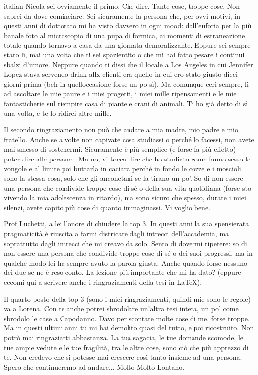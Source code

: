 \begin{otherlanguage*}{italian}
Nicola sei ovviamente il primo. Che dire. Tante cose, troppe cose. Non saprei da dove cominciare. Sei sicuramente la persona che, per ovvi motivi, in questi anni di dottorato mi ha visto davvero in ogni mood: dall'euforia per la più banale foto al microscopio di una pupa di formica, ai momenti di estraneazione totale quando tornavo a casa da una giornata demoralizzante. Eppure sei sempre stato lì, mai una volta che ti sei spazientito o che mi hai fatto pesare i continui sbalzi d'umore. Neppure quando ti dissi che il locale a Los Angeles in cui Jennifer Lopez stava servendo drink allx clienti era quello in cui ero stato giusto dieci giorni prima (beh in quell\curlyapostrophe{}occasione forse un po\curlyapostrophe{} sì). Ma comunque c\curlyapostrophe{}eri sempre, lì ad ascoltare le mie paure e i miei progetti, i miei mille ripensamenti e le mie fantasticherie sul riempire casa di piante e crani di animali. Ti ho già detto di sì una volta, e te lo ridirei altre mille.

Il secondo ringraziamento non può che andare a mia madre, mio padre e mio fratello. Anche se a volte non capivate cosa studiassi o perché lo facessi, non avete mai smesso di sostenermi. Sicuramente è più semplice (e forse fa più effetto) poter dire alle persone . Ma no, vi tocca dire che ho studiato come fanno sesso le vongole e al limite poi buttarla in caciara perché in fondo le cozze e i moscioli sono la stessa cosa, solo che gli anconetani se la tirano un po'. So di non essere una persona che condivide troppe cose di sé o della sua vita quotidiana (forse sto vivendo la mia adolescenza in ritardo), ma sono sicuro che spesso, durate i miei silenzi, avete capito più cose di quanto immaginassi. Vi voglio bene.

Prof Luchetti, a lei l'onore di chiudere la top 3. In questi anni la sua spensierata pragmaticità è riuscita a farmi districare dagli intrecci dell'accademia, ma soprattutto dagli intrecci che mi creavo da solo. Sento di dovermi ripetere: so di non essere una persona che condivide troppe cose di sé o dei suoi progressi, ma in qualche modo lei ha sempre avuto la parola giusta. Anche quando forse nessuno dei due se ne è reso conto. La lezione più importante che mi ha dato?  (eppure eccomi qui a scrivere anche i ringraziamenti della tesi in \LaTeX).

Il quarto posto della top 3 (sono i miei ringraziamenti, quindi mie sono le regole) va a Lorena. Con te anche potrei sbrodolare un'altra tesi intera, un po' come sbrodolo le case a Capodanno. Davo per scontate molte cose di me, forse troppe. Ma in questi ultimi anni tu mi hai demolito quasi del tutto, e poi ricostruito. Non potrò mai ringraziarti abbastanza. La tua sagacia, le tue domande scomode, le tue ampie vedute e le tue fragilità, tra le altre cose, sono ciò che più apprezzo di te. Non credevo che si potesse mai crescere così tanto insieme ad una persona. Spero che continueremo ad andare... Molto Molto Lontano.


\end{otherlanguage*}
